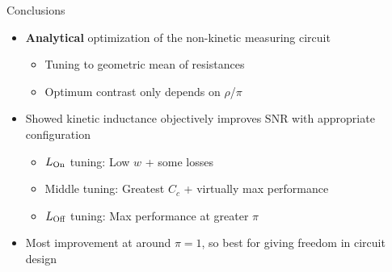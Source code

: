 \documentclass[../main.tex]{subfiles}
\begin{document}
%
\begin{frame}{Conclusions}
\begin{itemize}
    \item \textbf{Analytical} optimization of the non-kinetic measuring circuit
        \begin{itemize}
            \item Tuning to geometric mean of resistances
            \item Optimum contrast only depends on \(\rho\)/\(\pi\)
        \end{itemize}
    \item Showed kinetic inductance objectively improves SNR with appropriate
        configuration
        \begin{itemize}
            \item \(L_{\text{On}}\) tuning: Low \(w\) + some losses
            \item Middle tuning: Greatest \(C_{c}\) + virtually max performance
            \item \(L_{\text{Off}}\) tuning: Max performance at greater \(\pi\)
        \end{itemize}
    \item Most improvement at around \(\pi = 1\), so best for giving freedom in
        circuit design
\end{itemize}
\end{frame}
\end{document}
